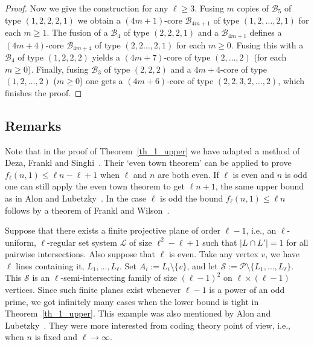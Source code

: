 \documentclass[12pt,a4paper]{amsart}
\numberwithin{equation}{section}
\theoremstyle{plain}
\theoremstyle{definition}
\newcommand{\NN}{n}
\def\cB{{\mathcal{B}}}
\def\cL{{\mathcal{L}}}
\def\cP{{\mathcal{P}}}
\def\cS{{\mathcal{S}}}
\begin{document}
\begin{proof}
Now we give the construction for any $\ell \geq 3$. Fusing $m$ copies of $\cB_5$ of type $(1,2,2,2,1)$ we obtain a $(4m+1)$-core $\cB_{4m+1}$ of type $(1, 2, \dots, 2,1)$ for each $m\geq 1$.
The fusion of a $\cB_4$ of type $(2,2,2,1)$ and a $\cB_{4m+1}$ defines a $(4m+4)$-core
  $\cB_{4m+4}$ of type $(2,2\dots, 2, 1)$ for each $m\geq 0$.
Fusing this with a $\cB_4$ of type $(1,2,2,2)$ yields a $(4m+7)$-core of type $(2,\dots, 2)$ (for each $m\geq 0$).
Finally, fusing $\cB_3$ of type $(2,2,2)$ and a  ${4m+4}$-core of type $(1,2, \dots, 2)$ ($m\geq 0$) one gets a
 $(4m+6)$-core of type $(2,2,3,2,\dots, 2)$, which finishes the proof.
\end{proof}



\subsection{Remarks}\label{ss_ell=1_remarks}



Note that in the proof of Theorem~\ref{th_1_upper} we have adapted a method of Deza, Frankl and Singhi~\cite{deza1983functions}.
Their `even town theorem' can be applied to prove $f_\ell (\NN,1) \leq \ell \NN-\ell+1$ when $\ell $ and $\NN$ are both even.
If $\ell $ is even and $\NN$ is odd one can still apply the even town theorem to get $\ell \NN+1$, the same upper bound  as in Alon and Lubetzky~\cite{xorproduct}.
In the case $\ell $ is odd the bound $f_\ell (\NN,1) \leq \ell \NN$ follows by a theorem of Frankl and Wilson~\cite{frankl1981intersection}.

Suppose that there exists a finite projective plane of order $\ell-1$, i.e., an $\ell$-uniform, $\ell$-regular set system $\cL$ of size $\ell^2-\ell+1$ such that $|L\cap L'|=1$ for all pairwise intersections. Also suppose that $\ell$ is even. Take any vertex $v$, we have $\ell$ lines containing it, $L_1, \dots,  L_{\ell}$.
Set  $A_i:=L_i\setminus \{ v\}$, and let $\cS:= \cP \setminus \{ L_1, \dots, L_\ell\}$.
This $\cS$ is an $\ell$-semi-intersecting family of size $(\ell-1)^2$ on $\ell \times (\ell-1)$ vertices.
Since such finite planes exist whenever $\ell-1$ is a power of an odd prime, we got
 infinitely many cases when the lower bound is tight in Theorem~\ref{th_1_upper}. This example was also mentioned by Alon and Lubetzky~\cite{xorproduct, AL2}. They were more interested from coding theory point of view, i.e., when $n$ is fixed and $\ell\to \infty$.
\end{document}

